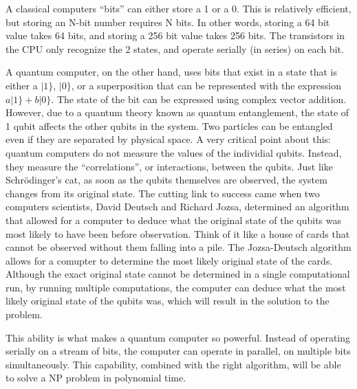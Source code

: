\documentclass[10pt,journal,compsoc]{IEEEtran}
\begin{document}


A classical computers ``bits'' can either store a 1 or a 0. This is relatively efficient, but storing an N-bit number requires N bits. In other words, storing a 64 bit value takes 64 bits, and storing a 256 bit value takes 256 bits. The transistors in the CPU only recognize the 2 states, and operate serially (in series) on each bit. 

A quantum computer, on the other hand, uses bits that exist in a state that is either a $|1\}$, $|0\}$, or a superposition that can be represented with the expression $a|1\} + b|0\}$. The state of the bit can be expressed using complex vector addition. However, due to a quantum theory known as quantum entanglement, the state of 1 qubit affects the other qubits in the system. Two particles can be entangled even if they are separated by physical space. A very critical point about this: quantum computers do not measure the values of the individial qubits. Instead, they measure the ``correlations'', or interactions, between the qubits. Just like Schr\"{o}dinger's cat, as soon as the qubits themselves are observed, the system changes from its original state. The cutting link to success came when two computers scientists, David Deutsch and Richard Jozsa, determined an algorithm that allowed for a computer to deduce what the original state of the qubits was most likely to have been before observation. Think of it like a house of cards that cannot be observed without them falling into a pile. The Jozsa-Deutsch algorithm allows for a comupter to determine the most likely original state of the cards. Although the exact original state cannot be determined in a single computational run, by running multiple computations, the computer can deduce what the most likely original state of the qubits was, which will result in the solution to the problem\cite{NIST}.


This ability is what makes a quantum computer so powerful. Instead of operating serially on a stream of bits, the computer can operate in parallel, on multiple bits simultaneously. This capability, combined with the right algorithm, will be able to solve a NP problem in polynomial time. 
\end{document}
